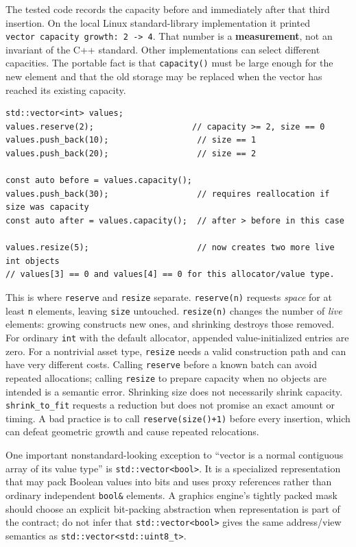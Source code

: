 The tested code records the capacity before and immediately after that third insertion. On the local Linux standard-library implementation it printed \texttt{vector\ capacity\ growth:\ 2\ -\textgreater{}\ 4}. That number is a \textbf{measurement}, not an invariant of the C++ standard. Other implementations can select different capacities. The portable fact is that \texttt{capacity()} must be large enough for the new element and that the old storage may be replaced when the vector has reached its existing capacity.

\begin{verbatim}
std::vector<int> values;
values.reserve(2);                    // capacity >= 2, size == 0
values.push_back(10);                  // size == 1
values.push_back(20);                  // size == 2

const auto before = values.capacity();
values.push_back(30);                  // requires reallocation if size was capacity
const auto after = values.capacity();  // after > before in this case

values.resize(5);                      // now creates two more live int objects
// values[3] == 0 and values[4] == 0 for this allocator/value type.
\end{verbatim}

This is where \texttt{reserve} and \texttt{resize} separate. \texttt{reserve(n)} requests \emph{space} for at least \texttt{n} elements, leaving \texttt{size} untouched. \texttt{resize(n)} changes the number of \emph{live} elements: growing constructs new ones, and shrinking destroys those removed. For ordinary \texttt{int} with the default allocator, appended value-initialized entries are zero. For a nontrivial asset type, \texttt{resize} needs a valid construction path and can have very different costs. Calling \texttt{reserve} before a known batch can avoid repeated allocations; calling \texttt{resize} to prepare capacity when no objects are intended is a semantic error. Shrinking size does not necessarily shrink capacity. \texttt{shrink\_to\_fit} requests a reduction but does not promise an exact amount or timing. A bad practice is to call \texttt{reserve(size()+1)} before every insertion, which can defeat geometric growth and cause repeated relocations.

One important nonstandard-looking exception to ``vector is a normal contiguous array of its value type'' is \texttt{std::vector\textless{}bool\textgreater{}}. It is a specialized representation that may pack Boolean values into bits and uses proxy references rather than ordinary independent \texttt{bool\&} elements. A graphics engine's tightly packed mask should choose an explicit bit-packing abstraction when representation is part of the contract; do not infer that \texttt{std::vector\textless{}bool\textgreater{}} gives the same address/view semantics as \texttt{std::vector\textless{}std::uint8\_t\textgreater{}}.

